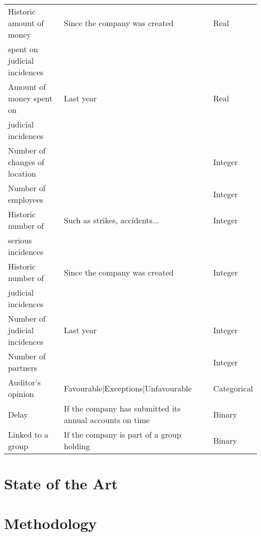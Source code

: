 \documentclass[a4paper,10pt,onecolumn,preprint,3p]{elsarticle}
\begin{document}
\begin{table}[htpb]
\begin{scriptsize}
\begin{tabular}{lll}
Historic amount of money   & Since the company was created & Real\\
spent on judicial incidences & &\\ \noalign{\smallskip}\hline
Amount of money spent on  & Last year & Real\\
judicial incidences & &\\
Number of changes of location & & Integer\\
Number of employees & & Integer\\
Historic number of & Such as strikes, accidents...  &  Integer\\
serious incidences & &\\
Historic number of  & Since the company was created &  Integer\\
judicial incidences & &\\
Number of judicial incidences & Last year &  Integer\\
Number of partners &  & Integer\\
Auditor's opinion & Favourable|Exceptions|Unfavourable & Categorical\\
Delay & If the company has submitted its annual accounts on time &  Binary\\
Linked to a group &If the company is part of a group holding &  Binary\\
\end{tabular}
\end{scriptsize}
\end{table}


\section{State of the Art}
\label{sec:sota}


\section{Methodology}
\label{sec:methodology}
\end{document}
